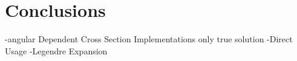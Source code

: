 \section{Conclusions}
\label{sec:conclusions}

-angular Dependent Cross Section Implementations only true solution
  -Direct Usage
  -Legendre Expansion
